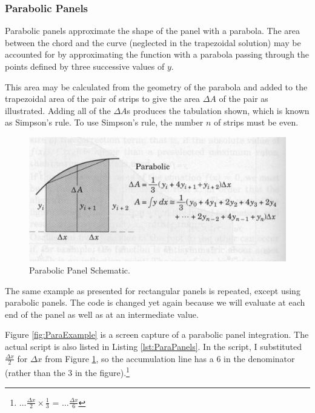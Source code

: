 \subsubsection{Parabolic Panels}
Parabolic panels approximate the shape of the panel with a parabola.  The area between the chord and the curve (neglected in the trapezoidal solution) may be accounted for by approximating the function with a parabola passing through the points defined by three successive values of $y$.  

This area may be calculated from the geometry of the parabola and added to the trapezoidal area of the pair of strips to give the area $\Delta A$ of the pair as illustrated. Adding all of the $\Delta A$s produces the tabulation shown, which is known as Simpson's rule. To use Simpson's rule, the number $n$ of strips must be even.

\begin{figure}[h!] %
   \centering
   \includegraphics[width=5in]{./3-Differentation/ParabolicPanels.jpg} 
   \caption{Parabolic Panel Schematic.}
   \label{fig:ParabolicPanels}
\end{figure}

The same example as presented for rectangular panels is repeated, except using parabolic panels.  The code is changed yet again because we will evaluate at each end of the panel as well as at an intermediate value.

Figure \ref{fig:ParaExample} is a screen capture of a parabolic panel integration.   
The actual script is also listed in Listing \ref{lst:ParaPanels}. 
In the script, I substituted  $\frac{\Delta x}{2}$ for $\Delta x$ from Figure \ref{fig:ParabolicPanels}, so the accumulation line has a 6 in the denominator (rather than the 3 in the figure).\footnote{$\dots \frac{\Delta x}{2} \times \frac{1}{3}$ = $\dots \frac{\Delta x}{6}$}

